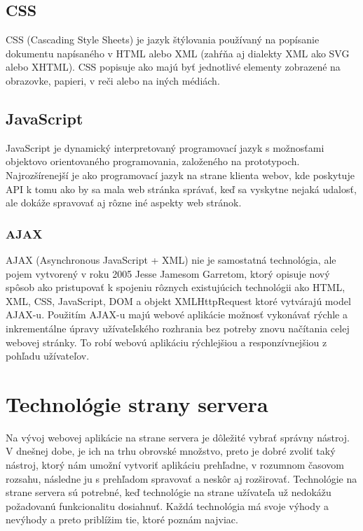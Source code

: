 \subsection*{CSS}

CSS (Cascading Style Sheets) je jazyk štýlovania používaný na popísanie dokumentu napísaného v HTML alebo XML (zahŕňa aj dialekty XML ako SVG alebo XHTML). CSS popisuje ako majú byť jednotlivé elementy zobrazené na obrazovke, papieri, v reči alebo na iných médiách. \citep{web:css}

\subsection*{JavaScript}

JavaScript je dynamický interpretovaný programovací jazyk s možnosťami objektovo orientovaného programovania, založeného na prototypoch. Najrozšírenejší je ako programovací jazyk na strane klienta webov, kde poskytuje API k tomu ako by sa mala web stránka správať, keď sa vyskytne nejaká udalosť, ale dokáže spravovať aj rôzne iné aspekty web stránok. \citep{web:javascript}

\subsubsection*{AJAX}

AJAX (Asynchronous JavaScript + XML) nie je samostatná technológia, ale pojem vytvorený v roku 2005 Jesse Jamesom Garretom, ktorý opisuje nový spôsob ako pristupovať k spojeniu rôznych existujúcich technológii ako HTML, XML, CSS, JavaScript, DOM a objekt XMLHttpRequest ktoré vytvárajú model AJAX-u. Použitím AJAX-u majú webové aplikácie možnosť vykonávať rýchle a inkrementálne úpravy užívateľského rozhrania bez potreby znovu načítania celej webovej stránky. To robí webovú aplikáciu rýchlejšiou a responzívnejšiou z pohľadu užívateľov. \citep{web:ajax}

\section{Technológie strany servera}

Na vývoj webovej aplikácie na strane servera je dôležité vybrať správny nástroj. V dnešnej dobe, je ich na trhu obrovské množstvo, preto je dobré zvoliť taký nástroj, ktorý nám umožní vytvoriť aplikáciu prehľadne, v rozumnom časovom rozsahu, následne ju s prehľadom spravovať a neskôr aj rozširovať. Technológie na strane servera sú potrebné, keď technológie na strane užívateľa už nedokážu požadovanú funkcionalitu dosiahnuť. Každá technológia má svoje výhody a nevýhody a preto priblížim tie, ktoré poznám najviac.


